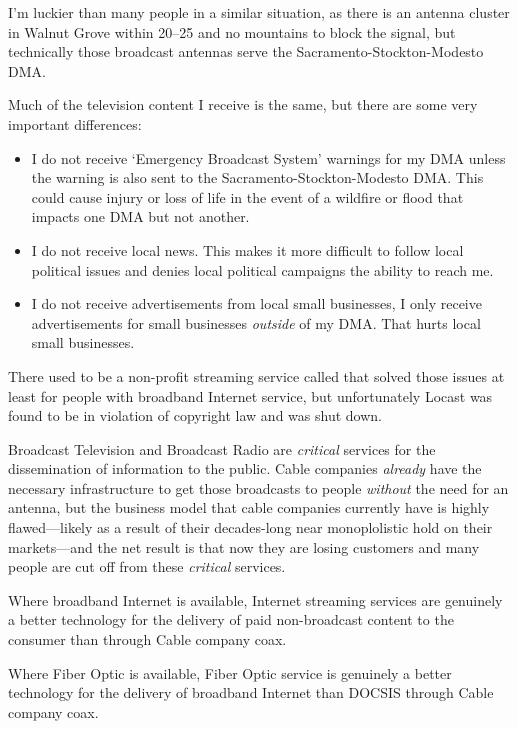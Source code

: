 I'm luckier than many people in a similar situation, as there is an antenna cluster in Walnut
Grove within \SIrange{20}{25}{\mile} and no mountains to block the signal, but technically
those broadcast antennas serve the Sacramento-Stockton-Modesto DMA.

Much of the television content I receive is the same, but there are some very important
differences:

\begin{itemize}
  \item I do not receive `Emergency Broadcast System' warnings for my DMA unless the warning
        is also sent to the Sacramento-Stockton-Modesto DMA. This could cause injury or loss
        of life in the event of a wildfire or flood that impacts one DMA but not another.
  \item I do not receive local news. This makes it more difficult to follow local political
        issues and denies local political campaigns the ability to reach me.
  \item I do not receive advertisements from local small businesses, I only receive advertisements
        for small businesses \emph{outside} of my DMA. That hurts local small businesses.
\end{itemize}

There used to be a non-profit streaming service called 
that solved those issues at least for people with broadband Internet service, but unfortunately
Locast was found to be in violation of copyright law and was shut down.

Broadcast Television and Broadcast Radio are \emph{critical} services for the dissemination of
information to the public. Cable companies \emph{already} have the necessary infrastructure to
get those broadcasts to people \emph{without} the need for an antenna, but the business model
that cable companies currently have is highly flawed---likely as a result of their decades-long
near monoplolistic hold on their markets---and the net result is that now they are losing
customers and many people are cut off from these \emph{critical} services.

Where broadband Internet is available, Internet streaming services are genuinely a better technology
for the delivery of paid non-broadcast content to the consumer than through Cable company coax.

Where Fiber Optic is available, Fiber Optic service is genuinely a better technology for the delivery
of broadband Internet than DOCSIS through Cable company coax.

